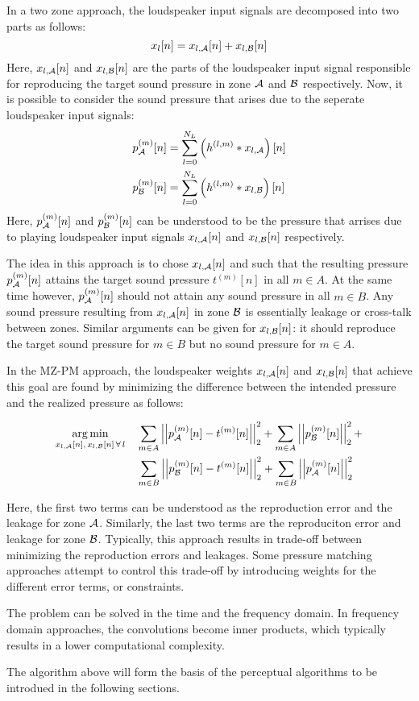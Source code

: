 In a two zone approach, the loudspeaker input signals are decomposed into two parts as follows:
\begin{equation}
    x_l[n] = x_{l,\mathcal{A}}[n] + x_{l,\mathcal{B}}[n]
\end{equation}
Here, $x_{l,\mathcal{A}}[n]$ and $x_{l,\mathcal{B}}[n]$ are the parts of the loudspeaker input signal responsible for reproducing the target sound pressure 
in zone $\mathcal{A}$ and $\mathcal{B}$ respectively.
Now, it is possible to consider the sound pressure that arises due to the seperate loudspeaker input signals:
\begin{align}
    p_{\mathcal{A}}^{(m)}[n] &= \sum_{l=0}^{N_L} \left(h^{(l,m)} \ast x_{l,\mathcal{A}}\right)[n] \\
    p_{\mathcal{B}}^{(m)}[n] &= \sum_{l=0}^{N_L} \left(h^{(l,m)} \ast x_{l,\mathcal{B}}\right)[n]
\end{align}
Here, $p_{\mathcal{A}}^{(m)}[n]$ and $p_{\mathcal{B}}^{(m)}[n]$ can be understood to be the pressure that arrises due to 
playing loudspeaker input signals $x_{l,\mathcal{A}}[n]$ and $x_{l,\mathcal{B}}[n]$ respectively. 

The idea in this approach is to chose $x_{l,\mathcal{A}}[n]$ and such that the resulting pressure $p_{\mathcal{A}}^{(m)}[n]$ attains the target sound pressure $t^{(m)}[n]$ in all $m \in A$.   
At the same time however, $p_{\mathcal{A}}^{(m)}[n]$ should not attain any sound pressure in all $m \in B$.
Any sound pressure resulting from $x_{l,\mathcal{A}}[n]$ in zone $\mathcal{B}$ is essentially leakage or cross-talk between zones. 
Similar arguments can be given for $x_{l,\mathcal{B}}[n]$: it should reproduce the target sound pressure for $m \in B$ but no sound pressure for $m \in A$. 

In the MZ-PM approach, the loudspeaker weights $x_{l,\mathcal{A}}[n]$ and $x_{l,\mathcal{B}}[n]$ that achieve this goal are found by 
minimizing the difference between the intended pressure and the realized pressure as follows:

\begin{align}
    \argmin{x_{l,\za}[n],\,x_{l,\zb}[n]\,\forall\,l}{
       &\sum_{m\in A} \norm[2][2]{p_\za^{(m)}[n] - t^{(m)}[n]} +
        \sum_{m\in A} \norm[2][2]{p_\zb^{(m)}[n]} + \\
       &\sum_{m\in B} \norm[2][2]{p_\zb^{(m)}[n] - t^{(m)}[n]} + 
        \sum_{m\in B} \norm[2][2]{p_\za^{(m)}[n]}
    }
\end{align}

Here, the first two terms can be understood as the reproduction error and the leakage for zone $\mathcal{A}$.
Similarly, the last two terms are the reproduciton error and leakage for zone $\mathcal{B}$. 
Typically, this approach results in trade-off between minimizing the reproduction errors and leakages. 
Some pressure matching approaches attempt to control this trade-off by introducing weights for the different error terms, or constraints.

The problem can be solved in the time and the frequency domain.
In frequency domain approaches, the convolutions become inner products, which typically results in a lower computational complexity.

The algorithm above will form the basis of the perceptual algorithms to be introdued in the following sections.
